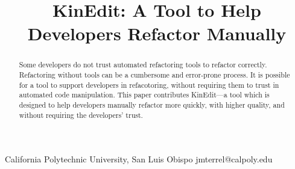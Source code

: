 \documentclass{sigplanconf}
\begin{document}
\setlength{\pdfpageheight}{\paperheight}
\setlength{\pdfpagewidth}{\paperwidth}




\permissiontopublish             %


\newcommand{\pname}{KinEdit}

\title{\pname{}: A Tool to Help Developers Refactor Manually}

           {California Polytechnic University, San Luis Obispo}
           {jmterrel@calpoly.edu}

\maketitle

\begin{abstract}
Some developers do not trust automated refactoring tools to refactor correctly.
Refactoring without tools can be a cumbersome and error-prone process.
It is possible for a tool to support developers in refacotoring, without
requiring them to trust in automated code manipulation.
This paper contributes \pname{}---a tool which is designed to help developers
manually refactor more quickly, with higher quality,
and without requiring the developers' trust.
\end{abstract}

\end{document}
